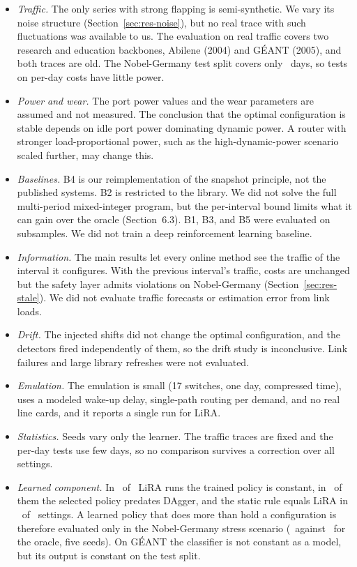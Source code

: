 \documentclass[preprint,12pt]{elsarticle}
\begin{document}
\begin{itemize}
\item \emph{Traffic.} The only series with strong flapping is semi-synthetic. We vary its noise structure (Section~\ref{sec:res-noise}), but no real trace with such fluctuations was available to us. The evaluation on real traffic covers two research and education backbones, Abilene (2004) and G\'{E}ANT (2005), and both traces are old. The Nobel-Germany test split covers only \nobTestDays\ days, so tests on per-day costs have little power.
\item \emph{Power and wear.} The port power values and the wear parameters are assumed and not measured. The conclusion that the optimal configuration is stable depends on idle port power dominating dynamic power. A router with stronger load-proportional power, such as the high-dynamic-power scenario scaled further, may change this.
\item \emph{Baselines.} B4 is our reimplementation of the snapshot principle, not the published systems. B2 is restricted to the library. We did not solve the full multi-period mixed-integer program, but the per-interval bound limits what it can gain over the oracle (Section~6.3). B1, B3, and B5 were evaluated on subsamples. We did not train a deep reinforcement learning baseline.
\item \emph{Information.} The main results let every online method see the traffic of the interval it configures. With the previous interval's traffic, costs are unchanged but the safety layer admits violations on Nobel-Germany (Section~\ref{sec:res-stale}). We did not evaluate traffic forecasts or estimation error from link loads.
\item \emph{Drift.} The injected shifts did not change the optimal configuration, and the detectors fired independently of them, so the drift study is inconclusive. Link failures and large library refreshes were not evaluated.
\item \emph{Emulation.} The emulation is small (17 switches, one day, compressed time), uses a modeled wake-up delay, single-path routing per demand, and no real line cards, and it reports a single run for LiRA.
\item \emph{Statistics.} Seeds vary only the learner. The traffic traces are fixed and the per-day tests use few days, so no comparison survives a correction over all settings.
\item \emph{Learned component.} In \liraConstRuns\ of \liraTotalRuns\ LiRA runs the trained policy is constant, in \daggerRoundZero\ of them the selected policy predates DAgger, and the static rule equals LiRA in \staticSame\ of \staticTotal\ settings. A learned policy that does more than hold a configuration is therefore evaluated only in the Nobel-Germany stress scenario (\nobJLiRAst\ against \nobJOst\ for the oracle, five seeds). On G\'{E}ANT the classifier is not constant as a model, but its output is constant on the test split.
\end{itemize}
\end{document}
